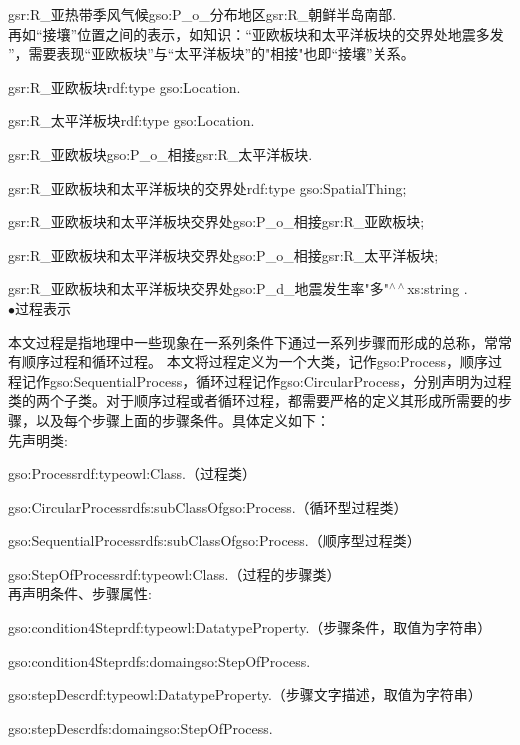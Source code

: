 gsr:R\_亚热带季风气候\quad gso:P\_o\_分布地区\quad gsr:R\_朝鲜半岛南部\quad .
\\
再如“接壤”位置之间的表示，如知识：“亚欧板块和太平洋板块的交界处地震多发
”，需要表现“亚欧板块”与“太平洋板块”的"相接"也即“接壤”关系。

gsr:R\_亚欧板块\quad rdf:type \quad gso:Location\quad .

gsr:R\_太平洋板块\quad rdf:type \quad gso:Location\quad .

gsr:R\_亚欧板块\quad gso:P\_o\_相接\quad gsr:R\_太平洋板块\quad .

gsr:R\_亚欧板块和太平洋板块的交界处\quad rdf:type \quad gso:SpatialThing\quad ;\quad 

gsr:R\_亚欧板块和太平洋板块交界处\quad gso:P\_o\_相接\quad gsr:R\_亚欧板块\quad ;

gsr:R\_亚欧板块和太平洋板块交界处\quad gso:P\_o\_相接\quad gsr:R\_太平洋板块\quad ;

gsr:R\_亚欧板块和太平洋板块交界处\quad gso:P\_d\_地震发生率\quad "多"$^{\land\land}$xs:string .
\\

$\bullet$过程表示

本文过程是指地理中一些现象在一系列条件下通过一系列步骤而形成的总称，常常有顺序过程和循环过程。 本文将过程定义为一个大类，记作gso:Process，顺序过程记作gso:SequentialProcess，循环过程记作gso:CircularProcess，分别声明为过程类的两个子类。对于顺序过程或者循环过程，都需要严格的定义其形成所需要的步骤，以及每个步骤上面的步骤条件。具体定义如下：\\
先声明类:

gso:Process\quad rdf:type\quad owl:Class\quad .\quad （过程类）

gso:CircularProcess\quad rdfs:subClassOf\quad gso:Process\quad .（循环型过程类）

gso:SequentialProcess\quad rdfs:subClassOf\quad gso:Process\quad .\quad （顺序型过程类）

gso:StepOfProcess\quad rdf:type\quad owl:Class\quad .（过程的步骤类）
\\
再声明条件、步骤属性:

gso:condition4Step\quad rdf:type\quad owl:DatatypeProperty\quad .\quad （步骤条件，取值为字符串）

gso:condition4Step\quad rdfs:domain\quad gso:StepOfProcess\quad .

gso:stepDesc\quad rdf:type\quad owl:DatatypeProperty\quad .\quad （步骤文字描述，取值为字符串）

gso:stepDesc\quad rdfs:domain\quad gso:StepOfProcess\quad .

